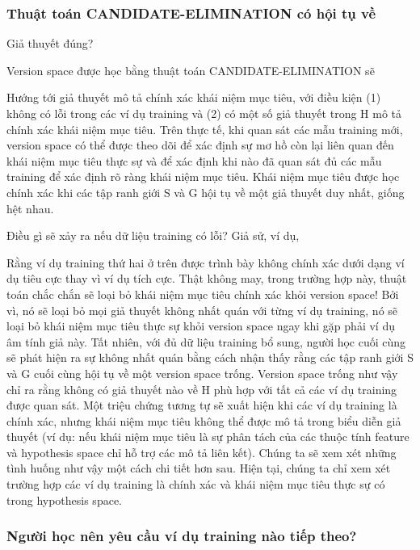 \subsubsection{Thuật toán CANDIDATE-ELIMINATION có hội tụ về}

Giả thuyết đúng?

Version space được học bằng thuật toán CANDIDATE-ELIMINATION sẽ

Hướng tới giả thuyết mô tả chính xác khái niệm mục tiêu, với điều kiện (1) không có lỗi trong các ví dụ training và (2) có một số giả thuyết trong H mô tả chính xác khái niệm mục tiêu. Trên thực tế, khi quan sát các mẫu training mới, version space có thể được theo dõi để xác định sự mơ hồ còn lại liên quan đến khái niệm mục tiêu thực sự và để xác định khi nào đã quan sát đủ các mẫu training để xác định rõ ràng khái niệm mục tiêu. Khái niệm mục tiêu được học chính xác khi các tập ranh giới S và G hội tụ về một giả thuyết duy nhất, giống hệt nhau.

Điều gì sẽ xảy ra nếu dữ liệu training có lỗi? Giả sử, ví dụ,

Rằng ví dụ training thứ hai ở trên được trình bày không chính xác dưới dạng ví dụ tiêu cực thay vì ví dụ tích cực. Thật không may, trong trường hợp này, thuật toán chắc chắn sẽ loại bỏ khái niệm mục tiêu chính xác khỏi version space! Bởi vì, nó sẽ loại bỏ mọi giả thuyết không nhất quán với từng ví dụ training, nó sẽ loại bỏ khái niệm mục tiêu thực sự khỏi version space ngay khi gặp phải ví dụ âm tính giả này. Tất nhiên, với đủ dữ liệu training bổ sung, người học cuối cùng sẽ phát hiện ra sự không nhất quán bằng cách nhận thấy rằng các tập ranh giới S và G cuối cùng hội tụ về một version space trống. Version space trống như vậy chỉ ra rằng không có giả thuyết nào về H phù hợp với tất cả các ví dụ training được quan sát. Một triệu chứng tương tự sẽ xuất hiện khi các ví dụ training là chính xác, nhưng khái niệm mục tiêu không thể được mô tả trong biểu diễn giả thuyết (ví dụ: nếu khái niệm mục tiêu là sự phân tách của các thuộc tính feature và hypothesis space chỉ hỗ trợ các mô tả liên kết). Chúng ta sẽ xem xét những tình huống như vậy một cách chi tiết hơn sau. Hiện tại, chúng ta chỉ xem xét trường hợp các ví dụ training là chính xác và khái niệm mục tiêu thực sự có trong hypothesis space.

\subsubsection{Người học nên yêu cầu ví dụ training nào tiếp theo?}

